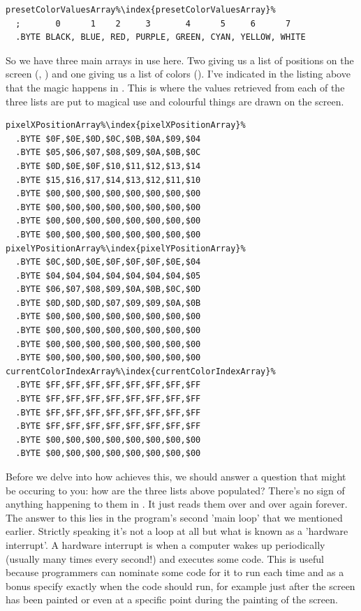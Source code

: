 \begin{lstlisting}[escapechar=\%]
presetColorValuesArray%\index{presetColorValuesArray}%
  ;       0      1    2     3       4      5     6      7
  .BYTE BLACK, BLUE, RED, PURPLE, GREEN, CYAN, YELLOW, WHITE
\end{lstlisting}

So we have three main arrays in use here. Two giving us a list of positions on the screen (, )
and one giving us a list of colors (). I've indicated in the listing above that the magic happens in 
. This is where the values retrieved from each of the three lists are put to magical use and colourful things
are drawn on the screen.

\begin{lstlisting}[caption=The arrays have a larger capacity than is actually used: each one above is 64 bytes long.,escapechar=\%]
pixelXPositionArray%\index{pixelXPositionArray}%   
  .BYTE $0F,$0E,$0D,$0C,$0B,$0A,$09,$04
  .BYTE $05,$06,$07,$08,$09,$0A,$0B,$0C
  .BYTE $0D,$0E,$0F,$10,$11,$12,$13,$14
  .BYTE $15,$16,$17,$14,$13,$12,$11,$10
  .BYTE $00,$00,$00,$00,$00,$00,$00,$00
  .BYTE $00,$00,$00,$00,$00,$00,$00,$00
  .BYTE $00,$00,$00,$00,$00,$00,$00,$00
  .BYTE $00,$00,$00,$00,$00,$00,$00,$00
pixelYPositionArray%\index{pixelYPositionArray}%   
  .BYTE $0C,$0D,$0E,$0F,$0F,$0F,$0E,$04
  .BYTE $04,$04,$04,$04,$04,$04,$04,$05
  .BYTE $06,$07,$08,$09,$0A,$0B,$0C,$0D
  .BYTE $0D,$0D,$0D,$07,$09,$09,$0A,$0B
  .BYTE $00,$00,$00,$00,$00,$00,$00,$00
  .BYTE $00,$00,$00,$00,$00,$00,$00,$00
  .BYTE $00,$00,$00,$00,$00,$00,$00,$00
  .BYTE $00,$00,$00,$00,$00,$00,$00,$00
currentColorIndexArray%\index{currentColorIndexArray}%   
  .BYTE $FF,$FF,$FF,$FF,$FF,$FF,$FF,$FF
  .BYTE $FF,$FF,$FF,$FF,$FF,$FF,$FF,$FF
  .BYTE $FF,$FF,$FF,$FF,$FF,$FF,$FF,$FF
  .BYTE $FF,$FF,$FF,$FF,$FF,$FF,$FF,$FF
  .BYTE $00,$00,$00,$00,$00,$00,$00,$00
  .BYTE $00,$00,$00,$00,$00,$00,$00,$00
\end{lstlisting}

Before we delve into how  achieves this, we should answer a question that might be occuring to you: how
are the three lists above populated? There's no sign of anything happening to them in . It just reads them over and
over again forever. The answer to this lies in the program's second 'main loop' that we mentioned earlier. 
Strictly speaking it's not a loop at all but what is known
as a 'hardware interrupt'. A hardware interrupt is when a computer wakes up periodically (usually many times every second!) and executes
some code. This is useful because programmers can nominate some code for it to run each time and as a bonus specify exactly when the code
should run, for example just after the screen has been painted or even at a specific point during the painting of the screen.  

